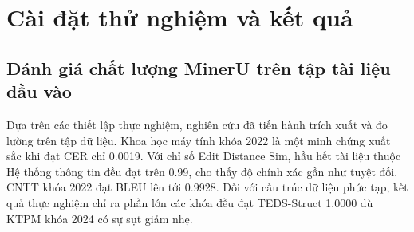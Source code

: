 \chapter{Cài đặt thử nghiệm và kết quả}
\label{Chapter4}

\section{Đánh giá chất lượng MinerU trên tập tài liệu đầu vào}
\indent Dựa trên các thiết lập thực nghiệm, nghiên cứu đã tiến hành trích xuất và đo lường trên tập dữ liệu. Khoa học máy tính khóa 2022 là một minh chứng xuất sắc khi đạt CER chỉ 0.0019. Với chỉ số Edit Distance Sim, hầu hết tài liệu thuộc Hệ thống thông tin đều đạt trên 0.99, cho thấy độ chính xác gần như tuyệt đối. CNTT khóa 2022 đạt BLEU lên tới 0.9928. Đối với cấu trúc dữ liệu phức tạp, kết quả thực nghiệm chỉ ra phần lớn các khóa đều đạt TEDS-Struct 1.0000 dù KTPM khóa 2024 có sự sụt giảm nhẹ.

